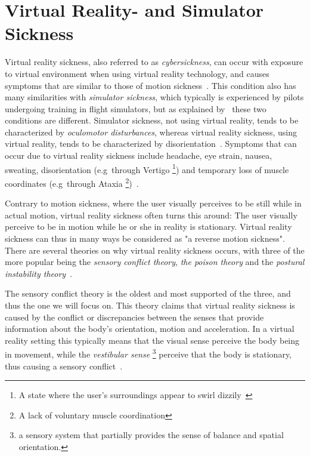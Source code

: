 \section{Virtual Reality- and Simulator Sickness}
\label{sec:vr_sickness}

Virtual reality sickness, also referred to as \textit{cybersickness}, can occur with exposure to virtual environment when using virtual reality technology, 
and causes symptoms that are similar to those of motion sickness~\citep{Jr2000}. This condition also has many similarities with \textit{simulator sickness}, which
typically is experienced by pilots undergoing training in flight simulators, but as explained by~\citet{Stanney1997} these two conditions are different.
Simulator sickness, not using virtual reality, tends to be characterized by \textit{oculomotor disturbances}, whereas virtual reality sickness, using virtual reality,
tends to be characterized by disorientation~\citep{Stanney1997}. 
Symptoms that can occur due to virtual reality sickness include headache, eye strain, nausea, sweating, disorientation (e.g~through Vertigo
\footnote{A state where the user's surroundings appear to swirl dizzily~\citep{Jr2000}}) and temporary loss of muscle coordinates (e.g~through Ataxia
\footnote{A lack of voluntary muscle coordination})~\citep{Jr2000}.

Contrary to motion sickness, where the user visually perceives to be still while in actual motion, 
virtual reality sickness often turns this around: The user visually perceive to be in motion while he or she in reality is stationary. 
Virtual reality sickness can thus in many ways be considered as "a reverse motion sickness". There are several theories on why virtual reality sickness 
occurs, with three of the more popular being the \textit{sensory conflict theory}, \textit{the poison theory} and the \textit{postural instability theory}~\citep{Jr2000}.

The sensory conflict theory is the oldest and most supported of the three, and thus the one we will focus on. 
This theory claims that virtual reality sickness is caused by the conflict or discrepancies between the senses that provide information about the body's orientation, motion and acceleration. 
In a virtual reality setting this typically means that the visual sense perceive the body being in movement, while the \textit{vestibular sense}
\footnote{a sensory system that partially provides the sense of balance and spatial orientation.} perceive that the body is stationary, thus causing a sensory conflict~\citep{Jr2000}.

